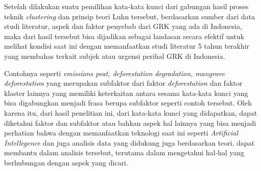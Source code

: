 Setelah dilakukan suatu pemilihan kata-kata kunci dari gabungan hasil proses teknik \textit{clustering} dan prinsip teori Luhn tersebut, berdasarkan sumber dari data studi literatur, aspek dan faktor penyebab dari GRK yang ada di Indonesia, maka dari hasil tersebut bisa dijadikan sebagai landasan secara efektif untuk melihat kondisi saat ini dengan memanfaatkan studi literatur 5 tahun terakhir yang membahas terkait subjek atau urgensi perihal GRK di Indonesia. 

Contohnya seperti \textit{emissions peat, deforestation degradation, mangrove deforestation} yang merupakan subfaktor dari faktor \textit{deforestation} dan faktor klaster lainnya yang memiliki keterkaitan antara sesama kata-kata kunci yang bisa digabungkan menjadi frasa berupa subfaktor seperti contoh tersebut. Oleh karena itu, dari hasil penelitian ini, dari kata-kata kunci yang didapatkan, dapat diketahui faktor dan subfaktor atau bahkan aspek hal lainnya yang bisa menjadi perhatian bahwa dengan memanfaatkan teknologi saat ini seperti \textit{Artificial Intellegence} dan juga analisis data yang didukung juga berdasarkan teori, dapat membantu dalam analisis tersebut, terutama dalam mengetahui hal-hal yang berhubungan dengan aspek yang dicari.